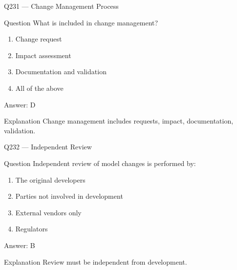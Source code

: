 \documentclass[aspectratio=169,8pt]{beamer}
\begin{document}
								\begin{frame}{Q231 --- Change Management Process}
									\begin{block}{Question}
										What is included in change management?
										\begin{enumerate}
											\item Change request
											\item Impact assessment
											\item Documentation and validation
											\item All of the above
										\end{enumerate}
									\end{block}
									\begin{exampleblock}{Answer: D}\end{exampleblock}
									\begin{block}{Explanation}
										Change management includes requests, impact, documentation, validation.
									\end{block}
								\end{frame}
								
								\begin{frame}{Q232 --- Independent Review}
									\begin{block}{Question}
										Independent review of model changes is performed by:
										\begin{enumerate}
											\item The original developers
											\item Parties not involved in development
											\item External vendors only
											\item Regulators
										\end{enumerate}
									\end{block}
									\begin{exampleblock}{Answer: B}\end{exampleblock}
									\begin{block}{Explanation}
										Review must be independent from development.
									\end{block}
								\end{frame}
								
\end{document}
